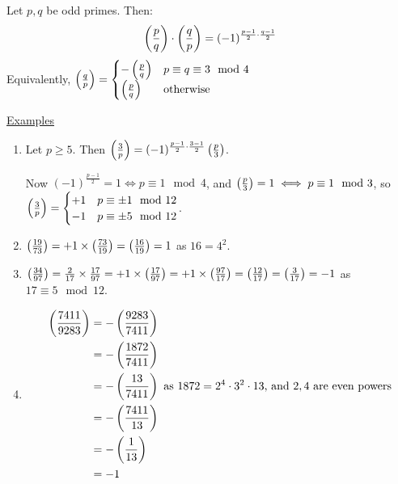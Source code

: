 \documentclass[10pt,a4paper]{article}
\begin{document}
\begin{theorem}
Let $p, q$ be odd primes. Then:
\begin{align*}
\left(\frac{p}{q}\right)\cdot \left(\frac{q}{p}\right) = (-1)^{\frac{p-1}{2}\cdot \frac{q-1}{2}}
\end{align*}
Equivalently, $\left(\frac{q}{p}\right) = \begin{cases} -\left(\frac{p}{q}\right) & p \equiv q \equiv 3 \mod 4 \\ \left(\frac{p}{q}\right) & \text{otherwise}\end{cases}$
\end{theorem}
\underline{Examples}
\begin{enumerate}
\item Let $p\geq 5$. Then $\left(\frac{3}{p}\right) = (-1)^{\frac{p-1}{2}\cdot \frac{3-1}{2}} \left(\frac{p}{3}\right)$. 

Now $(-1)^{\frac{p-1}{2}} = 1 \iff p \equiv 1 \mod 4$, and $\left(\frac{p}{3}\right) = 1 \iff p\equiv 1 \mod 3$, so $\left(\frac{3}{p}\right) = \begin{cases} +1 & p\equiv \pm 1\mod 12 \\ -1 & p \equiv \pm 5 \mod 12 \end{cases}$.

\item $\left(\frac{19}{73}\right) = +1 \times \left(\frac{73}{19}\right) = \left(\frac{16}{19}\right) = 1$ as $16=4^2$.

\item $\left(\frac{34}{97}\right) = \frac{2}{17} \times \frac{17}{97} = +1 \times \left(\frac{17}{97}\right) = +1 \times \left(\frac{97}{17}\right) = \left(\frac{12}{17}\right) = \left(\frac{3}{17}\right) = -1$ as $17 \equiv 5 \mod 12$.

\item 
\begin{align*}
\left(\frac{7411}{9283}\right) &= -\left(\frac{9283}{7411}\right)\\
&= -\left(\frac{1872}{7411}\right)\\
&= -\left(\frac{13}{7411}\right) \text{ as $1872=2^4\cdot 3^2\cdot 13$, and $2, 4$ are even powers}\\
&= -\left(\frac{7411}{13}\right)\\
&= -\left(\frac{1}{13}\right)\\
&= -1
\end{align*}
\end{enumerate}
\end{document}
